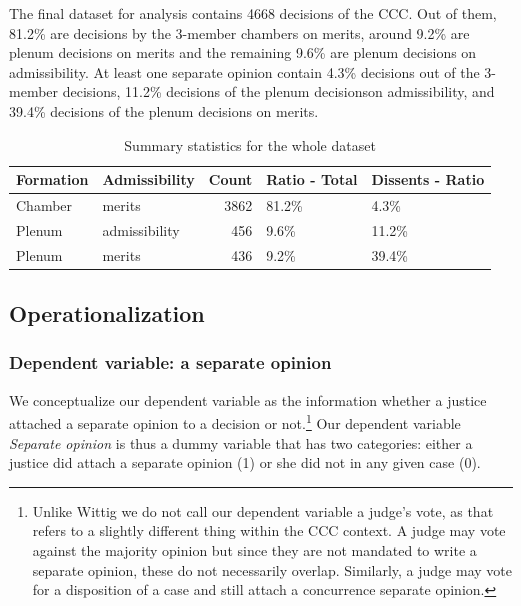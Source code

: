 \documentclass[
  11pt,
]{article}
\begin{document}
The final dataset for analysis contains 4668 decisions of the CCC. Out
of them, 81.2\% are decisions by the 3-member chambers on merits, around
9.2\% are plenum decisions on merits and the remaining 9.6\% are plenum
decisions on admissibility. At least one separate opinion contain 4.3\%
decisions out of the 3-member decisions, 11.2\% decisions of the plenum
decisionson admissibility, and 39.4\% decisions of the plenum decisions
on merits.

\begin{table}

\caption{\label{tab:unnamed-chunk-2}Summary statistics for the whole dataset}
\centering
\begin{tabular}[t]{l|l|r|l|l}
\hline
\textbf{Formation} & \textbf{Admissibility} & \textbf{Count} & \textbf{Ratio - Total} & \textbf{Dissents - Ratio}\\
\hline
Chamber & merits & 3862 & 81.2\% & 4.3\%\\
\hline
Plenum & admissibility & 456 & 9.6\% & 11.2\%\\
\hline
Plenum & merits & 436 & 9.2\% & 39.4\%\\
\hline
\end{tabular}
\end{table}

\hypertarget{operationalization}{%
\subsection{Operationalization}\label{operationalization}}

\hypertarget{dependent-variable-a-separate-opinion}{%
\subsubsection{Dependent variable: a separate
opinion}\label{dependent-variable-a-separate-opinion}}

We conceptualize our dependent variable as the information whether a
justice attached a separate opinion to a decision or not.\footnote{Unlike
  Wittig we do not call our dependent variable a judge's vote, as that
  refers to a slightly different thing within the CCC context. A judge
  may vote against the majority opinion but since they are not mandated
  to write a separate opinion, these do not necessarily overlap.
  Similarly, a judge may vote for a disposition of a case and still
  attach a concurrence separate opinion.} Our dependent variable
\emph{Separate opinion} is thus a dummy variable that has two
categories: either a justice did attach a separate opinion (1) or she
did not in any given case (0).
\end{document}
